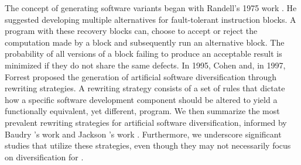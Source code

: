 The concept of generating software variants began with Randell's 1975 work \cite{10.1145/390016.808467}.
He suggested developing multiple alternatives for fault-tolerant instruction blocks. 
A program with these recovery blocks can, choose to accept or reject the computation made by a block and subsequently run an alternative block. 
The probability of all versions of a block failing to produce an acceptable result is minimized if they do not share the same defects.
In 1995, Cohen \etal \cite{cohen1993operating} and, in 1997, Forrest \cite{595185} proposed the generation of artificial software diversification through rewriting strategies.
A rewriting strategy consists of a set of rules that dictate how a specific software development component should be altered to yield a functionally equivalent, yet different, program. 
We then summarize the most prevalent rewriting strategies for artificial software diversification, informed by Baudry \etal's work \cite{natural_diversity} and Jackson \etal's work \cite{jackson}.
Furthermore, we underscore significant studies that utilize these strategies, even though they may not necessarily focus on diversification for \Wasm.



